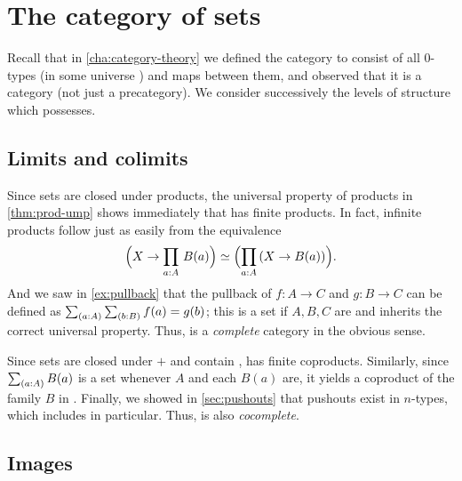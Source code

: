 \section{The category of sets}
\label{sec:piw-pretopos}

Recall that in \autoref{cha:category-theory} we defined the category \uset to consist of all $0$-types (in some universe \UU) and maps between them, and observed that it is a category (not just a precategory).
We consider successively the levels of structure which \uset possesses.

\subsection{Limits and colimits}
\label{subsec:limits-sets}

%
%

Since sets are closed under products, the universal property of products in \autoref{thm:prod-ump} shows immediately that \uset has finite products.
In fact, infinite products follow just as easily from the equivalence
\[ \Parens{X\to \prd{a:A} B(a)} \eqvsym \Parens{\prd{a:A} (X\to B(a))}.\]
And we saw in \autoref{ex:pullback} that the pullback of $f:A\to C$ and $g:B\to C$ can be defined as $\sm{a:A}{b:B} f(a)=g(b)$; this is a set if $A,B,C$ are and inherits the correct universal property.
Thus, \uset is a \emph{complete} category in the obvious sense.
%
%

Since sets are closed under $+$ and contain \emptyt, \uset has finite coproducts.
Similarly, since $\sm{a:A}B(a)$ is a set whenever $A$ and each $B(a)$ are, it yields a coproduct of the family $B$ in \uset.
Finally, we showed in \autoref{sec:pushouts} that pushouts exist in $n$-types, which includes \uset in particular.
Thus, \uset is also \emph{cocomplete}.
%
%

\subsection{Images}
\label{sec:image}

